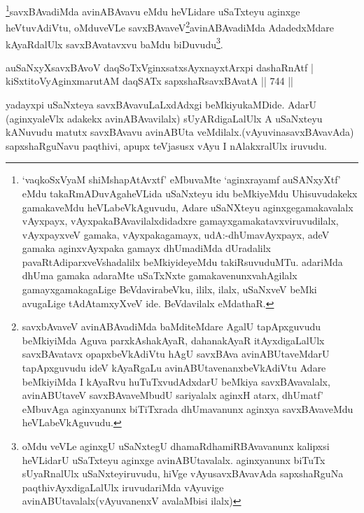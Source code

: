 \begin{artha}
\footnote{`vaqkoSxV\s yaM shiMshapAtAvxtf' eMbuvaMte `aginxrayamf auSANxyXtf' eMdu takaRmADuvAgaheVLida uSaNxteyu idu beMkiyeMdu Uhisuvudakekx gamakaveMdu heVLabeVkAguvudu, Adare uSaNXteyu aginxgegamakavalalx vAyxpayx, vAyxpakaBAvavilalxdidadxre gamayxgamakatavxviruvudilalx, vAyxpayxveV gamaka, vAyxpakagamayx, udA:-dhUmavAyxpayx, adeV gamaka aginxvAyxpaka gamayx dhUmadiMda dUradalilx pavaRtAdiparxveVshadalilx beMkiyideyeMdu takiRsuvuduMTu. adariMda dhUma gamaka adaraMte uSaTxNxte gamakavenunxvahAgilalx gamayxgamakagaLige BeVdavirabeVku, ililx, ilalx, uSaNxveV beMki avugaLige tAdAtamxyXveV ide. BeVdavilalx eMdathaR.}savxBAvadiMda avinABAvavu eMdu heVLidare uSaTxteyu aginxge heVtuvAdiVtu, oMduveVLe savxBAvaveV\footnote{savxbAvaveV avinABAvadiMda baMditeMdare AgalU tapApxguvudu beMkiyiMda Aguva parxkAshakAyaR, dahanakAyaR itAyxdigaLalUlx savxBAvatavx opapxbeVkAdiVtu hAgU savxBAva avinABUtaveMdarU tapApxguvudu ideV kAyaRgaLu avinABUtavenanxbeVkAdiVtu Adare beMkiyiMda I kAyaRvu huTuTxvudAdxdarU beMkiya savxBAvavalalx, avinABUtaveV savxBAvaveMbudU sariyalalx aginxH atarx, dhUmatf' eMbuvAga aginxyanunx biTiTxrada dhUmavanunx aginxya savxBAvaveMdu heVLabeVkAguvudu.}avinABAvadiMda AdadedxMdare kAyaRdalUlx savxBAvatavxvu baMdu biDuvudu\footnote{oMdu veVLe aginxgU uSaNxtegU dhamaRdhamiRBAvavanunx kalipxsi heVLidarU uSaTxteyu aginxge avinABUtavalalx. aginxyanunx biTuTx sUyaRnalUlx uSaNxteyiruvudu, hiVge vAyusavxBAvavAda sapxshaRguNa paqthivAyxdigaLalUlx iruvudariMda vAyuvige avinABUtavalalx(vAyuvanenxV avalaMbisi ilalx)}.
\end{artha}


\begin{shl}
auSaNxyXsavxBAvoV daqSoTxV\s ginxsatxsAyxnayxtArx\s pi dashaRnAtf | \\
kiSxtitoVyAginxmarutAM daqSATx sapxshaRsavxBAvatA \hfill||  744 ||  
\end{shl}

\begin{artha}
yadayxpi uSaNxteya savxBAvavuLaLxdAdxgi beMkiyukaMDide. AdarU (aginxyaleVlx adakekx avinABAvavilalx) sUyARdigaLalUlx A uSaNxteyu kANuvudu matutx savxBAvavu avinABUta veMdilalx.(vAyuvinasavxBAvavAda) sapxshaRguNavu paqthivi, apupx teVjasusx vAyu I nAlakxralUlx iruvudu.
\end{artha}



